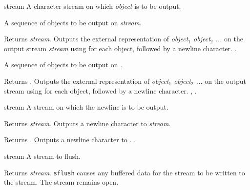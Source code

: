 \begin{optDefinition}
\begin{arguments}
    \item[stream] A character stream on which {\em object\/} is
    to be output.
    \item[{\optional{object$_1$ object$_2$ ...}}] A sequence of objects to be
    output on {\em stream}.
\end{arguments}
%
\result%
Returns {\em stream}.
%
\remarks%
Outputs the external representation of {\em object$_1$ object$_2$ ...} on the
output stream {\em stream\/} using  for each object,
followed by a newline character.
%
\seealso%
.

\begin{arguments}
    \item[{\optional{object$_1$ object$_2$ ...}}] A sequence of objects to be
    output on .
\end{arguments}
%
\result%
Returns .
%
\remarks%
Outputs the external representation of {\em object$_1$ object$_2$ ...} on the
output stream  using  for each object,
followed by a newline character.
%
\seealso%
, .

\begin{arguments}
    \item[stream] A stream on which the newline is to be output.
\end{arguments}
%
\result%
Returns {\em stream}.
%
\remarks%
Outputs a newline character to {\em stream}.

%
\result%
Returns .
%
\remarks%
Outputs a newline character to .
%
\seealso%
.

\begin{arguments}
    \item[stream] A stream to flush.
\end{arguments}
%
\result%
Returns {\em stream}.
%
\remarks%
{\tt sflush} causes any buffered data for the stream to be written to
the stream. The stream remains open.


\end{optDefinition}
